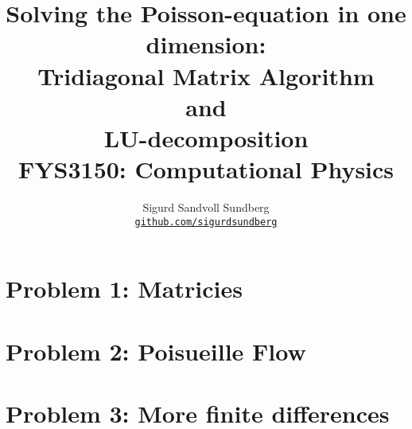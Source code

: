 \documentclass[10pt, a4paper]{amsart}
\title[Solving the Poisson-equation in one dimension]{Solving the Poisson-equation in one dimension: \\
\normalsize{Tridiagonal Matrix Algorithm\\
 and \\
 LU-decomposition} \\
  \hrulefill\small{ FYS3150: Computational Physics }\hrulefill}
\author[Sundberg]{Sigurd Sandvoll Sundberg \\
  \href{https://https://github.com/SigurdSundberg/GEO2300/}{\texttt{github.com/sigurdsundberg}}}
\begin{document}
\begin{titlepage}
\maketitle
\tableofcontents
\end{titlepage}

\section{Problem 1: Matricies}
\section{Problem 2: Poisueille Flow}
\section{Problem 3: More finite differences}





\end{document}
